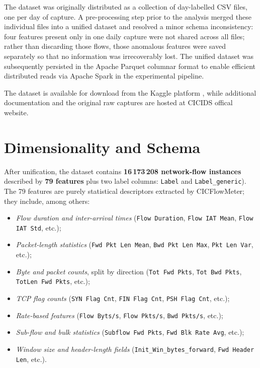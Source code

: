 \documentclass[../main.tex]{subfiles}
\begin{document}
The dataset was originally distributed as a collection of day-labelled CSV files, one per day of capture.  A pre-processing step prior to the analysis merged these individual files into a unified dataset and resolved a minor schema inconsistency: four features present only in one daily capture were not shared across all files; rather than discarding those flows, those anomalous features were saved separately so that no information was irrecoverably lost.
The unified dataset was subsequently persisted in the Apache Parquet columnar format to enable efficient distributed reads via Apache Spark in the experimental pipeline.

The dataset is available for download from the Kaggle platform \supercite{ids2018}, while additional documentation and the original raw captures are hosted at CICIDS offical website\supercite{cicids2018Official}.

\newpage
\section{Dimensionality and Schema}
\label{sec:dataset-dimensionality}

After unification, the dataset contains \textbf{16\,173\,208 network-flow instances} described by \textbf{79 features} plus two label columns: \texttt{Label} and \texttt{Label\_generic}).
The 79 features are purely statistical descriptors extracted by CICFlowMeter;
they include, among others:

\begin{itemize}
  \item \emph{Flow duration and inter-arrival times} (\texttt{Flow Duration},
        \texttt{Flow IAT Mean}, \texttt{Flow IAT Std}, etc.);
  \item \emph{Packet-length statistics} (\texttt{Fwd Pkt Len Mean},
        \texttt{Bwd Pkt Len Max}, \texttt{Pkt Len Var}, etc.);
  \item \emph{Byte and packet counts}, split by direction (\texttt{Tot Fwd
        Pkts}, \texttt{Tot Bwd Pkts}, \texttt{TotLen Fwd Pkts}, etc.);
  \item \emph{TCP flag counts} (\texttt{SYN Flag Cnt}, \texttt{FIN Flag
        Cnt}, \texttt{PSH Flag Cnt}, etc.);
  \item \emph{Rate-based features} (\texttt{Flow Byts/s}, \texttt{Flow
        Pkts/s}, \texttt{Bwd Pkts/s}, etc.);
  \item \emph{Sub-flow and bulk statistics} (\texttt{Subflow Fwd Pkts},
        \texttt{Fwd Blk Rate Avg}, etc.);
  \item \emph{Window size and header-length fields}
        (\texttt{Init\_Win\_bytes\_forward}, \texttt{Fwd Header Len}, etc.).
\end{itemize}
\end{document}
